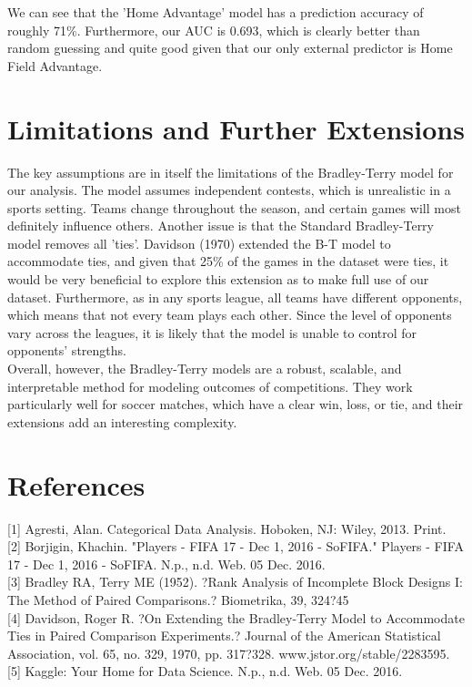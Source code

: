 \documentclass{article}
\begin{document}
We can see that the 'Home Advantage' model has a prediction accuracy of roughly 71\%. Furthermore, our AUC is 0.693, which is clearly better than random guessing and quite good given that our only external predictor is Home Field Advantage.

\section{Limitations and Further Extensions}

The key assumptions are in itself the limitations of the Bradley-Terry model for our analysis. The model assumes independent contests, which is unrealistic in a sports setting. Teams change throughout the season, and certain games will most definitely influence others. Another issue is that the Standard Bradley-Terry model removes all 'ties'. Davidson (1970) extended the B-T model to accommodate ties, and given that 25\% of the games in the dataset were ties, it would be very beneficial to explore this extension as to make full use of our dataset. Furthermore, as in any sports league, all teams have different opponents, which means that not every team plays each other. Since the level of opponents vary across the leagues, it is likely that the model is unable to control for opponents' strengths.\\

Overall, however, the Bradley-Terry models are a robust, scalable, and interpretable method for modeling outcomes of competitions. They work particularly well for soccer matches, which have a clear win, loss, or tie, and their extensions add an interesting complexity.

\section{References}

[1] Agresti, Alan. Categorical Data Analysis. Hoboken, NJ: Wiley, 2013. Print.\\

[2] Borjigin, Khachin. "Players - FIFA 17 - Dec 1, 2016 - SoFIFA." Players - FIFA 17 - Dec 1, 2016 - SoFIFA. N.p., n.d. Web. 05 Dec. 2016.\\

[3] Bradley RA, Terry ME (1952). ?Rank Analysis of Incomplete Block Designs I: The Method
of Paired Comparisons.? Biometrika, 39, 324?45\\

[4] Davidson, Roger R. ?On Extending the Bradley-Terry Model to Accommodate Ties in Paired Comparison Experiments.? Journal of the American Statistical Association, vol. 65, no. 329, 1970, pp. 317?328. www.jstor.org/stable/2283595.\\

[5] Kaggle: Your Home for Data Science. N.p., n.d. Web. 05 Dec. 2016.\\
\end{document}

